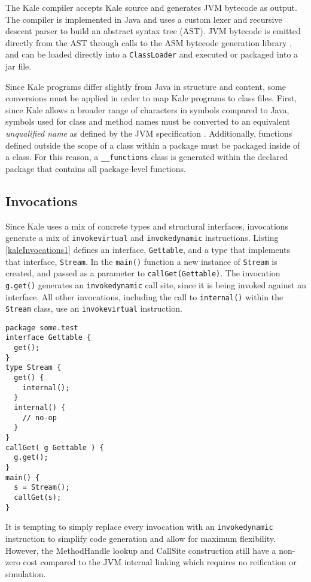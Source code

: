 The Kale compiler accepts Kale source and generates JVM bytecode as output.  The compiler is implemented in Java and uses a custom lexer and recursive descent parser to build an abstract syntax tree (AST).  JVM bytecode is emitted directly from the AST through calls to the ASM bytecode generation library \cite{asm-library}, and can be loaded directly into a \texttt{ClassLoader} and executed or packaged into a jar file.

Since Kale programs differ slightly from Java in structure and content, some conversions must be applied in order to map Kale programs to class files.  First, since Kale allows a broader range of characters in symbols compared to Java, symbols used for class and method names must be converted to an equivalent \emph{unqualified name} as defined by the JVM specification \cite[4.2.2]{jvms7}.  Additionally, functions defined outside the scope of a class within a package must be packaged inside of a class.  For this reason, a \texttt{\_\_functions} class is generated within the declared package that contains all package-level functions.

\subsection{Invocations}

Since Kale uses a mix of concrete types and structural interfaces, invocations generate a mix of \texttt{invokevirtual} and \texttt{invokedynamic} instructions.  Listing \ref{kaleInvocations1} defines an interface, \texttt{Gettable}, and a type that implements that interface, \texttt{Stream}.  In the \texttt{main()} function a new instance of \texttt{Stream} is created, and passed as a parameter to \texttt{callGet(Gettable)}.  The invocation \texttt{g.get()} generates an \texttt{invokedynamic} call site, since it is being invoked against an interface.  All other invocations, including the call to \texttt{internal()} within the \texttt{Stream} class, use an \texttt{invokevirtual} instruction.

\begin{lstlisting}[language=Kale,caption=Invocations in Kale,label=kaleInvocations1]
package some.test
interface Gettable {
  get();
}
type Stream {
  get() {
    internal();
  }
  internal() {
    // no-op
  }
}
callGet( g Gettable ) {
  g.get();
}
main() {
  s = Stream();
  callGet(s);
}
\end{lstlisting}

It is tempting to simply replace every invocation with an \texttt{invokedynamic} instruction to simplify code generation and allow for maximum flexibility.  However, the MethodHandle lookup and CallSite construction still have a non-zero cost compared to the JVM internal linking which requires no reification or simulation.

